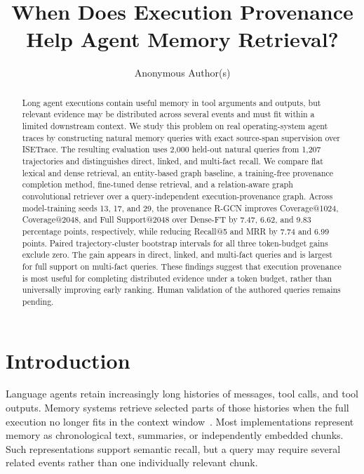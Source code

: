 \documentclass[sigconf,anonymous,review]{acmart}
\title{When Does Execution Provenance Help Agent Memory Retrieval?}
\author{Anonymous Author(s)}
\begin{document}
\begin{abstract}
Long agent executions contain useful memory in tool arguments and outputs, but relevant evidence may be distributed across several events and must fit within a limited downstream context. We study this problem on real operating-system agent traces by constructing natural memory queries with exact source-span supervision over ISETrace. The resulting evaluation uses 2,000 held-out natural queries from 1,207 trajectories and distinguishes direct, linked, and multi-fact recall. We compare flat lexical and dense retrieval, an entity-based graph baseline, a training-free provenance completion method, fine-tuned dense retrieval, and a relation-aware graph convolutional retriever over a query-independent execution-provenance graph. Across model-training seeds 13, 17, and 29, the provenance R-GCN improves Coverage@1024, Coverage@2048, and Full Support@2048 over Dense-FT by 7.47, 6.62, and 9.83 percentage points, respectively, while reducing Recall@5 and MRR by 7.74 and 6.99 points. Paired trajectory-cluster bootstrap intervals for all three token-budget gains exclude zero. The gain appears in direct, linked, and multi-fact queries and is largest for full support on multi-fact queries. These findings suggest that execution provenance is most useful for completing distributed evidence under a token budget, rather than universally improving early ranking. Human validation of the authored queries remains pending.
\end{abstract}


\maketitle

\section{Introduction}
\label{sec:introduction}

Language agents retain increasingly long histories of messages, tool calls, and tool outputs. Memory systems retrieve selected parts of those histories when the full execution no longer fits in the context window~\cite{park2023generative,packer2023memgpt,shinn2023reflexion}. Most implementations represent memory as chronological text, summaries, or independently embedded chunks. Such representations support semantic recall, but a query may require several related events rather than one individually relevant chunk.
\end{document}
